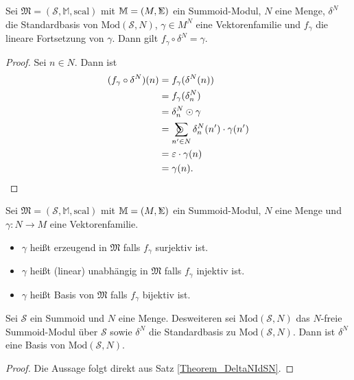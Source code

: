 \documentclass{article}
\DeclareMathOperator*{\Sigmacirc}{%
  \ThisStyle{\mathop{\ensurestackMath{\stackinset{c}{-0.75\LMpt}{c}{}{%
  \rotatebox[origin=lb]{-90}{$\circ$}}{\SavedStyle\Sigma}}}}}
\DeclareMathOperator*{\sumcirc}{%
  \ThisStyle{\mathop{\ensurestackMath{\stackinset{c}{-1.5\LMpt}{c}{}{%
  \rotatebox[origin=lb]{-90}{$\SavedStyle\scalerel*{\bm\Circle}{%
  i}$}}{\SavedStyle\sum}}}}}
\begin{document}
\begin{theorem}
  Sei $\mathfrak{M} = (\mathcal{S}, \mathbb{M}, \text{scal})$ mit $\mathbb{M} = (M, \Sigmacirc)$ ein Summoid-Modul, $N$ eine Menge,
  $\delta^N$ die Standardbasis von $\text{Mod}(\mathcal{S}, N)$,
  $\gamma \in M^N$ eine Vektorenfamilie und
  $f_\gamma$ die lineare Fortsetzung von $\gamma$.
  Dann gilt $f_\gamma \circ \delta^N = \gamma$.
\end{theorem}
\begin{proof}
  Sei $n \in N$.
  Dann ist
  \begin{align*}
    (f_\gamma \circ \delta^N)(n) 
    &= f_\gamma(\delta^N(n)) \\
    &= f_\gamma(\delta^N_n) \\
    &= \delta^N_n \odot \gamma \\
    &= \sumcirc_{n' \in N}\delta^N_n(n') \cdot \gamma(n') \\
    &= \varepsilon \cdot \gamma(n) \\
    &= \gamma(n).
  \end{align*}
\end{proof}

\begin{definition}
  Sei $\mathfrak{M} = (\mathcal{S}, \mathbb{M}, \text{scal})$ mit $\mathbb{M} = (M, \Sigmacirc)$ ein Summoid-Modul, $N$ eine Menge
  und $\gamma \colon N \to M$ eine Vektorenfamilie.
  \begin{itemize}
    \item $\gamma$ heißt erzeugend in $\mathfrak{M}$ falls $f_\gamma$ surjektiv ist.
    \item $\gamma$ heißt (linear) unabhängig in $\mathfrak{M}$ falls $f_\gamma$ injektiv ist.
    \item $\gamma$ heißt Basis von $\mathfrak{M}$ falls $f_\gamma$ bijektiv ist.
  \end{itemize}
\end{definition}

\begin{theorem}
  Sei $\mathcal{S}$ ein Summoid und
  $N$ eine Menge. Desweiteren sei
  $\text{Mod}(\mathcal{S}, N)$ das $N$-freie Summoid-Modul über $\mathcal{S}$ sowie
  $\delta^N$ die Standardbasis zu $\text{Mod}(\mathcal{S}, N)$.
  Dann ist $\delta^N$ eine Basis von $\text{Mod}(\mathcal{S}, N)$.
\end{theorem}
\begin{proof}
  Die Aussage folgt direkt aus Satz \ref{Theorem_DeltaNIdSN}.
\end{proof}
\end{document}
